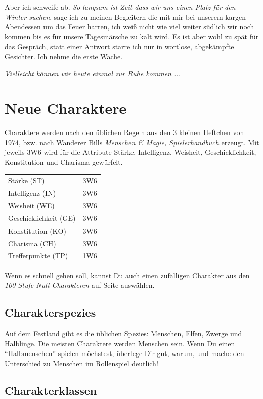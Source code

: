 \documentclass[11pt]{wbzine}
\begin{document}
\begin{multicols}{2}
Aber ich schweife ab. \textit{So langsam ist Zeit dass wir uns einen
Platz für den Winter suchen}, sage ich zu meinen Begleitern die mit
mir bei unserem kargen Abendessen um das Feuer harren, ich weiß
nicht wie viel weiter südlich wir noch kommen bis es für unsere
Tagesmärsche zu kalt wird. Es ist aber wohl zu spät für das
Gespräch, statt einer Antwort starre ich nur in wortlose,
abgekämpfte Gesichter. Ich nehme die erste Wache. 

\textit{Vielleicht können wir heute einmal zur Ruhe kommen ...}


\section{Neue Charaktere}

Charaktere werden nach den üblichen Regeln aus den 3 kleinen
Heftchen von 1974, bzw. nach Wanderer Bills \textit{Menschen \&
Magie, Spielerhandbuch} erzeugt. Mit jeweils 3W6 wird für die
Attribute Stärke, Intelligenz, Weisheit, Geschicklichkeit,
Konstitution und Charisma gewürfelt.

\begin{tabularx}{\columnwidth}{Zc}
    Stärke (ST) & 3W6 \\
    Intelligenz (IN) & 3W6 \\
    Weisheit (WE) & 3W6 \\
    Geschicklichkeit (GE) & 3W6 \\
    Konstitution (KO) & 3W6 \\
    Charisma (CH) & 3W6 \\
    Trefferpunkte (TP) & 1W6 \\
\end{tabularx}

Wenn es schnell gehen soll, kannst Du auch einen zufälligen
Charakter aus den \textit{100 Stufe Null Charakteren} auf Seite
\pageref{100char} auswählen.

\subsection{Charakterspezies}

Auf dem Festland gibt es die üblichen Spezies: Menschen, Elfen,
Zwerge und Halblinge. Die meisten Charaktere werden Menschen sein.
Wenn Du einen ``Halbmenschen'' spielen möchstest, überlege Dir gut,
warum, und mache den Unterschied zu Menschen im Rollenspiel
deutlich!

\subsection{Charakterklassen}


\end{multicols}
\end{document}
